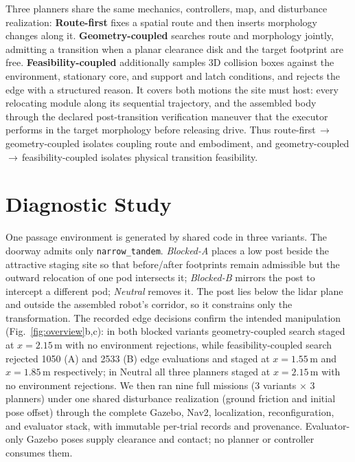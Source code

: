 \documentclass[conference]{IEEEtran}
\begin{document}
Three planners share the same mechanics, controllers, map, and disturbance realization:
\textbf{Route-first} fixes a spatial route and then inserts morphology changes along it.
\textbf{Geometry-coupled} searches route and morphology jointly, admitting a transition when a planar clearance disk and the target footprint are free.
\textbf{Feasibility-coupled} additionally samples 3D collision boxes against the environment, stationary core, and support and latch conditions, and rejects the edge with a structured reason. It covers both motions the site must host: every relocating module along its sequential trajectory, and the assembled body through the declared post-transition verification maneuver that the executor performs in the target morphology before releasing drive.
Thus route-first\,\(\rightarrow\)\,geometry-coupled isolates coupling route and embodiment, and geometry-coupled\,\(\rightarrow\)\,feasibility-coupled isolates physical transition feasibility.

\section{Diagnostic Study}
One passage environment is generated by shared code in three variants. The doorway admits only \texttt{narrow\_tandem}. \emph{Blocked-A} places a low post beside the attractive staging site so that before/after footprints remain admissible but the outward relocation of one pod intersects it; \emph{Blocked-B} mirrors the post to intercept a different pod; \emph{Neutral} removes it. The post lies below the lidar plane and outside the assembled robot's corridor, so it constrains only the transformation. The recorded edge decisions confirm the intended manipulation (Fig.~\ref{fig:overview}b,c): in both blocked variants geometry-coupled search staged at \(x=2.15\)\,m with no environment rejections, while feasibility-coupled search rejected 1050 (A) and 2533 (B) edge evaluations and staged at \(x=1.55\)\,m and \(x=1.85\)\,m respectively; in Neutral all three planners staged at \(x=2.15\)\,m with no environment rejections. We then ran nine full missions (3 variants \(\times\) 3 planners) under one shared disturbance realization (ground friction and initial pose offset) through the complete Gazebo, Nav2, localization, reconfiguration, and evaluator stack, with immutable per-trial records and provenance. Evaluator-only Gazebo poses supply clearance and contact; no planner or controller consumes them.
\end{document}
